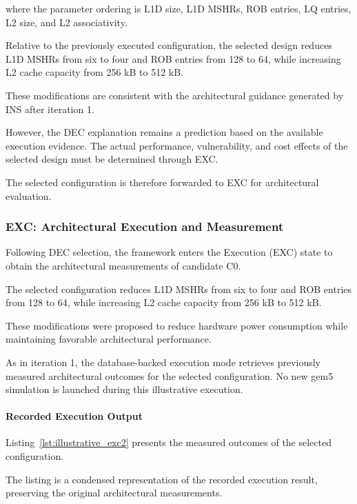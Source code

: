 where the parameter ordering is
L1D size, L1D MSHRs, ROB entries,
LQ entries, L2 size, and L2 associativity.

Relative to the previously executed
configuration, the selected design
reduces L1D MSHRs from six to four
and ROB entries from 128 to 64,
while increasing L2 cache capacity
from 256 kB to 512 kB.

These modifications are consistent
with the architectural guidance
generated by INS after iteration 1.

However, the DEC explanation remains
a prediction based on the available
execution evidence. The actual
performance, vulnerability, and
cost effects of the selected design
must be determined through EXC.

The selected configuration is therefore
forwarded to EXC for architectural
evaluation.



\subsubsection{EXC: Architectural Execution and Measurement}
\label{app:illustrative_exc2}

Following DEC selection, the framework enters
the Execution (EXC) state to obtain the
architectural measurements of candidate C0.

The selected configuration reduces L1D MSHRs
from six to four and ROB entries from 128
to 64, while increasing L2 cache capacity
from 256 kB to 512 kB.

These modifications were proposed to reduce
hardware power consumption while maintaining
favorable architectural performance.

As in iteration 1, the database-backed
execution mode retrieves previously measured
architectural outcomes for the selected
configuration. No new gem5 simulation is
launched during this illustrative execution.

\paragraph{Recorded Execution Output}

Listing~\ref{lst:illustrative_exc2}
presents the measured outcomes of the
selected configuration.

The listing is a condensed representation
of the recorded execution result, preserving
the original architectural measurements.

